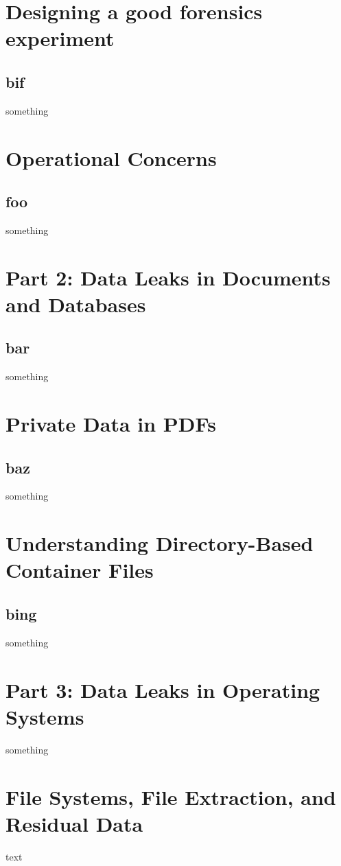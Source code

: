 \documentclass[11pt,fleqn,letter]{book} %
\begin{document}
\chapter{Designing a good forensics experiment}
\section{bif}
something

\chapter{Operational Concerns}
\section{foo}
something

\chapter{Part 2: Data Leaks in Documents and Databases}
\section{bar}
something

\chapter{Private Data in PDFs}
\section{baz}
something

\chapter{Understanding Directory-Based Container Files}
\section{bing}
something

\chapter{Part 3: Data Leaks in Operating Systems}
something

\chapter{File Systems, File Extraction, and Residual Data}
text

\end{document}
